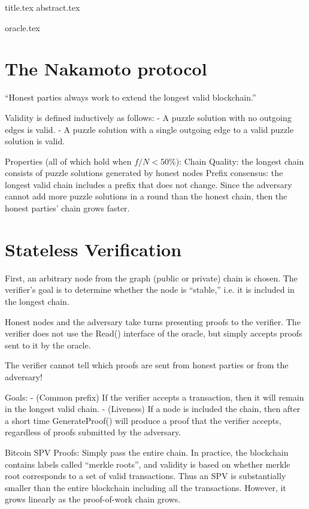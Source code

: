 \documentclass[11pt]{llncs}
\begin{document}
{title.tex}
\thispagestyle{plain}
{abstract.tex}


{oracle.tex}

\section{The Nakamoto protocol}

``Honest parties always work to extend the longest valid blockchain.''

Validity is defined inductively as follows:
- A puzzle solution with no outgoing edges is valid.
- A puzzle solution with a single outgoing edge to a valid puzzle solution is valid.

Properties (all of which hold when $f/N < 50\%$):
    Chain Quality:  the longest chain consists of puzzle solutions generated by honest nodes
    Prefix consensus: the longest valid chain includes a prefix that does not change.
        Since the adversary cannot add more puzzle solutions in a round than the honest chain, then the honest parties’ chain grows faster.

\section{Stateless Verification}

First, an arbitrary node from the graph (public or private) chain is chosen.
The verifier’s goal is to determine whether the node is ``stable,'' i.e. it is included in the longest chain.

Honest nodes and the adversary take turns presenting proofs to the verifier. The verifier does not use the Read() interface of the oracle, but simply accepts proofs sent to it by the oracle.

The verifier cannot tell which proofs are sent from honest parties or from the adversary!

Goals:
- (Common prefix) If the verifier accepts a transaction, then it will remain in the longest valid chain.
- (Liveness) If a node is included the chain, then after a short time GenerateProof() will produce a proof that the verifier accepts, regardless of proofs submitted by the adversary.

Bitcoin SPV Proofs:
	Simply pass the entire chain.
	In practice, the blockchain contains labels called “merkle roots”, and validity is based on whether merkle root corresponds to a set of valid transactions. Thus an SPV is substantially smaller than the entire blockchain including all the transactions. However, it grows linearly as the proof-of-work chain grows.
\end{document}
